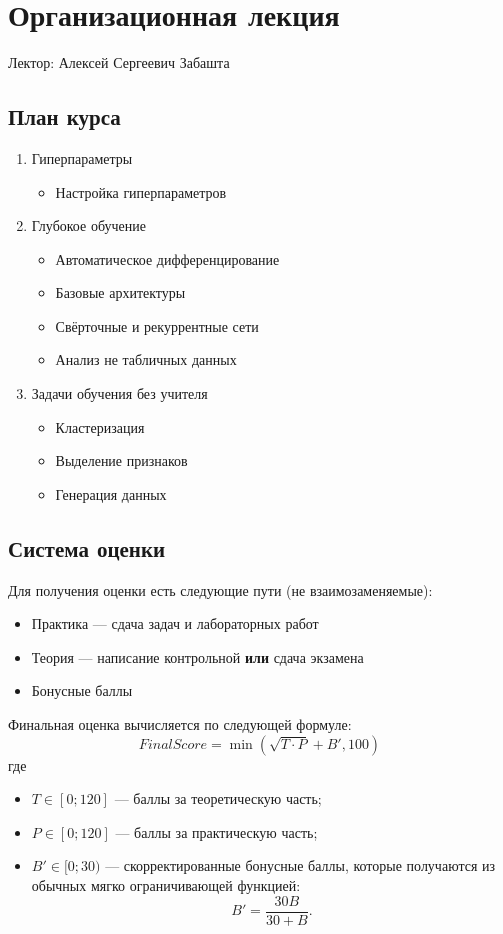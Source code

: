 \chapter{Организационная лекция}

Лектор: Алексей Сергеевич Забашта

\section{План курса}
\begin{enumerate}
    \item Гиперпараметры
    \begin{itemize}
        \item Настройка гиперпараметров
    \end{itemize}
    \item Глубокое обучение
    \begin{itemize}
        \item Автоматическое дифференцирование
        \item Базовые архитектуры
        \item Свёрточные и рекуррентные сети
        \item Анализ не табличных данных
    \end{itemize}
    \item Задачи обучения без учителя
    \begin{itemize}
        \item Кластеризация
        \item Выделение признаков
        \item Генерация данных
    \end{itemize}
\end{enumerate}

\section{Система оценки}

Для получения оценки есть следующие пути (не взаимозаменяемые):
\begin{itemize}
    \item Практика --- сдача задач и лабораторных работ
    \item Теория --- написание контрольной \textbf{или} сдача экзамена
    \item Бонусные баллы
\end{itemize}

Финальная оценка вычисляется по следующей формуле:
\[
    FinalScore = \min\left(\sqrt{T\cdot P} + B', 100\right)
\]
где
\begin{itemize}
    \item $T\in[0; 120]$ --- баллы за теоретическую часть;
    \item $P\in[0; 120]$ --- баллы за практическую часть;
    \item $B'\in[0; 30)$ --- скорректированные бонусные баллы, которые получаются из обычных мягко ограничивающей функцией:
    \[
        B' = \dfrac{30B}{30 + B}.
    \]
\end{itemize}

